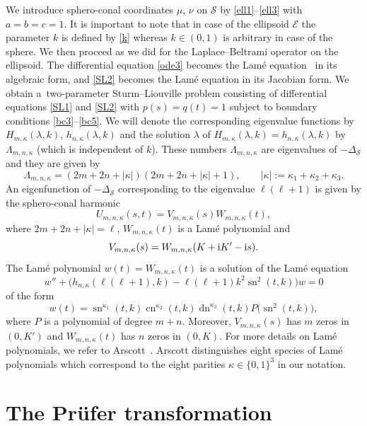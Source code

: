 \documentclass[10pt,a4paper]{amsart}
\newcommand{\E}{\mathcal{E}}
\newcommand{\Sp}{\mathcal{S}}
\DeclareMathOperator{\sn}{sn}
\DeclareMathOperator{\cn}{cn}
\DeclareMathOperator{\dn}{dn}
\numberwithin{equation}{section}
\begin{document}
We introduce sphero-conal coordinates $\mu$, $\nu$ on $\Sp$ by \eqref{ell1}--\eqref{ell3} with $a=b=c=1$.
It is important to note that in case of the ellipsoid $\E$ the parameter $k$ is defined by \eqref{k}
whereas $k\in(0,1)$ is arbitrary in case of the sphere.
We then proceed as we did for the Laplace--Beltrami operator on the ellipsoid.
The differential equation \eqref{ode3} becomes the Lam\'e equation~\cite[formula~(29.2.2)]{dlmf} in its algebraic form,
and \eqref{SL2} becomes the Lam\'e equation in its Jacobian form.
We obtain
a~two-parameter Sturm--Liouville problem consisting of differential equations \eqref{SL1} and \eqref{SL2}
with $p(s)=q(t)=1$ subject to boundary conditions \eqref{bc3}--\eqref{bc5}.
We will denote the corresponding eigenvalue functions by $H_{m,\kappa}(\lambda,k)$, $h_{n,\kappa}(\lambda,k)$
and the solution $\lambda$ of $H_{m,\kappa}(\lambda,k)=h_{n,\kappa}(\lambda,k)$ by~$\Lambda_{m,n,\kappa}$ (which is independent of $k$).
These numbers $\Lambda_{m,n,\kappa}$ are eigenvalues of $-\Delta_\Sp$ and they are given by
\begin{equation}\label{Lambda}
 \Lambda_{m,n,\kappa}=(2m+2n+|\kappa|)(2m+2n+|\kappa|+1),\qquad |\kappa|:=\kappa_1+\kappa_2+\kappa_3 .
 \end{equation}
An eigenfunction of $-\Delta_\Sp$ corresponding to the eigenvalue $\ell(\ell+1)$ is given by the sphero-conal harmonic
\begin{equation}\label{harmonic}
 U_{m,n,\kappa}(s,t)=V_{m,n,\kappa}(s)W_{m,n,\kappa}(t),
 \end{equation}
where $2m+2n+|\kappa|=\ell$, $W_{m,n,\kappa}(t)$ is a Lam\'e polynomial and
\[ V_{m,n,\kappa}(s)= W_{m,n,\kappa}(K+{\rm i}K'-{\rm i}s).\]
The Lam\'e polynomial $w(t)=W_{m,n,\kappa}(t)$ is a solution of the Lam\'e equation
\[ w''+\bigl(h_{n,\kappa}(\ell(\ell+1),k)-\ell(\ell+1)k^2 \sn^2(t,k)\bigr) w=0\]
of the form
\[ w(t)=\sn^{\kappa_1}(t,k)\cn^{\kappa_2}(t,k)\dn^{\kappa_3}(t,k) P\bigl(\sn^2(t,k)\bigr),\]
where $P$ is a polynomial of degree $m+n$. Moreover, $V_{m,n,\kappa}(s)$ has $m$ zeros in $(0,K')$ and $W_{m,n,\kappa}(t)$ has $n$ zeros in $(0,K)$.
For more details on Lam\'e polynomials, we refer to Arscott~\mbox{\cite[Chapter~IX]{A}}. Arscott distinguishes eight species of
Lam\'e polynomials which correspond to the eight parities $\kappa\in\{0,1\}^3$ in our notation.

\section{The Pr\"ufer transformation}\label{prufer}
\end{document}
